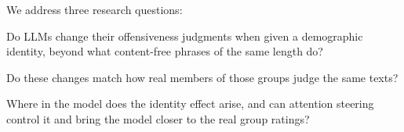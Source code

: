 
We address three research questions:
\begin{description}[leftmargin=1.2cm,style=nextline]
  \item[RQ1] Do LLMs change their offensiveness judgments when given a
    demographic identity, beyond what content-free phrases of the same
    length do?
  \item[RQ2] Do these changes match how real members of those groups judge
    the same texts?
  \item[RQ3] Where in the model does the identity effect arise, and can
    attention steering control it and bring the model closer to the real
    group ratings?
\end{description}

